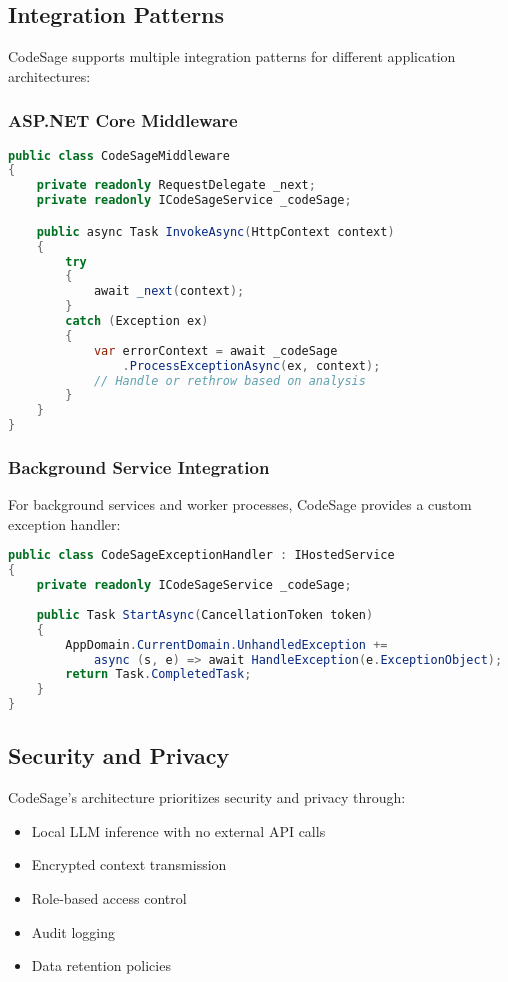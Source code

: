 \subsection{Integration Patterns}
CodeSage supports multiple integration patterns for different application architectures:

\subsubsection{ASP.NET Core Middleware}
\begin{lstlisting}[language=csharp]
public class CodeSageMiddleware
{
    private readonly RequestDelegate _next;
    private readonly ICodeSageService _codeSage;

    public async Task InvokeAsync(HttpContext context)
    {
        try
        {
            await _next(context);
        }
        catch (Exception ex)
        {
            var errorContext = await _codeSage
                .ProcessExceptionAsync(ex, context);
            // Handle or rethrow based on analysis
        }
    }
}
\end{lstlisting}

\subsubsection{Background Service Integration}
For background services and worker processes, CodeSage provides a custom exception handler:

\begin{lstlisting}[language=csharp]
public class CodeSageExceptionHandler : IHostedService
{
    private readonly ICodeSageService _codeSage;
    
    public Task StartAsync(CancellationToken token)
    {
        AppDomain.CurrentDomain.UnhandledException += 
            async (s, e) => await HandleException(e.ExceptionObject);
        return Task.CompletedTask;
    }
}
\end{lstlisting}

\subsection{Security and Privacy}
CodeSage's architecture prioritizes security and privacy through:

\begin{itemize}
    \item Local LLM inference with no external API calls
    \item Encrypted context transmission
    \item Role-based access control
    \item Audit logging
    \item Data retention policies
\end{itemize}

